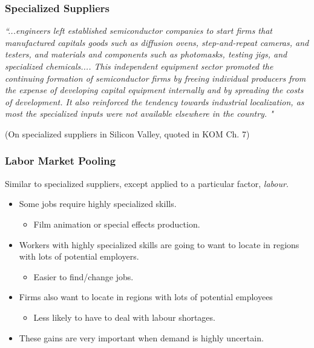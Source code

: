 \documentclass{beamer}
\begin{document}
\begin{frame}
	\frametitle{Specialized Suppliers}

		\emph{``...engineers left established semiconductor companies to start firms that manufactured capitals goods such as diffusion ovens, step-and-repeat cameras, and testers, and materials and components such as photomasks, testing jigs, and specialized chemicals.... This independent equipment sector promoted the continuing formation of semiconductor firms by freeing individual producers from the expense of developing capital equipment internally and by spreading the costs of development. It also reinforced the tendency towards industrial localization, as most the specialized inputs were not available elsewhere in the country. "} 
		
		\vspace{3mm}(On specialized suppliers in Silicon Valley, quoted in KOM Ch. 7)
	
\end{frame}


\begin{frame}
	\frametitle{Labor Market Pooling}
Similar to specialized suppliers, except applied to a particular factor, \emph{labour}.
	\begin{itemize}
		\item Some jobs require highly specialized skills.
			\begin{itemize}
				\item Film animation or special effects production.
			\end{itemize}
		\item Workers with highly specialized skills are going to want to locate in regions with lots of potential employers.
			\begin{itemize}
				\item Easier to find/change jobs.
			\end{itemize}
		\item Firms also want to locate in regions with lots of potential employees
			\begin{itemize}
				\item Less likely to have to deal with labour shortages.
			\end{itemize}
		\item These gains are very important when demand is highly uncertain.
	\end{itemize}
	
\end{frame}
\end{document}
